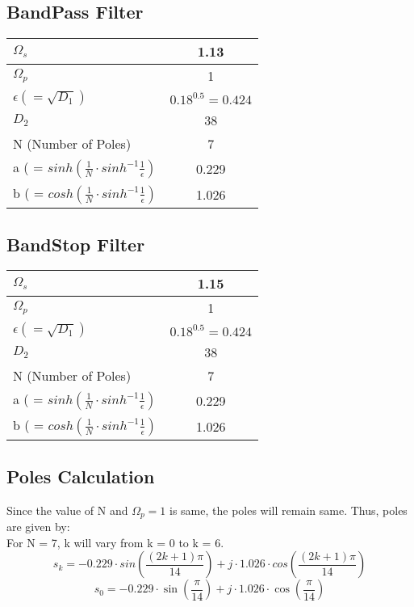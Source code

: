 \documentclass{article}
\begin{document}
\subsection{BandPass Filter}
\begin{table}[h]
    \centering
    \renewcommand{\arraystretch}{1.3}
    \begin{tabular}{|l|c|} \hline
        $\Omega_s$ & 1.13 \\ \hline
        $\Omega_p$ & 1 \\ \hline
        $\epsilon (= \sqrt{D_1})$ & $0.18^{0.5} = 0.424$ \\ \hline
        $D_2$ & 38 \\ \hline
        N (Number of Poles) & 7 \\ \hline
        a ( = $sinh(\frac{1}{N}\cdot sinh^{-1}\frac{1}{\epsilon})$ & 0.229\\ \hline
        b ( = $cosh(\frac{1}{N}\cdot sinh^{-1}\frac{1}{\epsilon})$ & 1.026 \\ \hline
    \end{tabular}
\end{table}
\subsection{BandStop Filter}
\begin{table}[h]
    \centering
    \renewcommand{\arraystretch}{1.3}
    \begin{tabular}{|l|c|} \hline
        $\Omega_s$ & 1.15 \\ \hline
        $\Omega_p$ & 1 \\ \hline
        $\epsilon (= \sqrt{D_1})$ & $0.18^{0.5} = 0.424$ \\ \hline
        $D_2$ & 38 \\ \hline
        N (Number of Poles) & 7 \\ \hline
        a ( = $sinh(\frac{1}{N}\cdot sinh^{-1}\frac{1}{\epsilon})$ & 0.229\\ \hline
        b ( = $cosh(\frac{1}{N}\cdot sinh^{-1}\frac{1}{\epsilon})$ & 1.026 \\ \hline
    \end{tabular}
\end{table}
\subsection{Poles Calculation}
Since the value of N and $\Omega_p = 1$ is same, the poles will remain same. Thus, poles are given by:\\
For N = 7, k will vary from k = 0 to k = 6. \\
\[
    s_k = -0.229\cdot sin\left(\frac{(2k+1)\pi}{14}\right) + j\cdot 1.026\cdot cos\left(\frac{(2k+1)\pi}{14}\right)
\]
\[
s_0 = -0.229\cdot \sin\left(\frac{\pi}{14}\right) + j\cdot 1.026\cdot \cos\left(\frac{\pi}{14}\right)
\]
\end{document}
